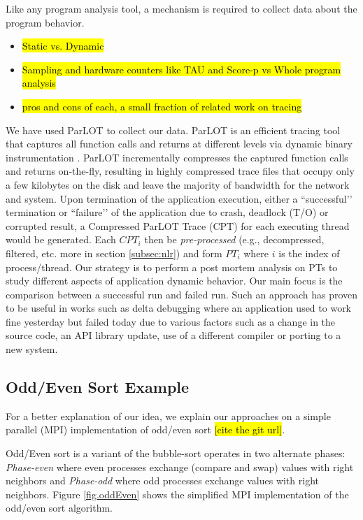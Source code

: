 Like any program analysis tool, a mechanism is required to collect data about the program behavior.

\begin{itemize}
\item \hl{Static vs. Dynamic}
\item \hl{Sampling and hardware counters like TAU and Score-p vs Whole program analysis}
\item \hl{pros and cons of each, a small fraction of related work on tracing}
\end{itemize}

We have used ParLOT \cite{parlot} to collect our data.
%
ParLOT is an efficient tracing tool that captures all function calls and returns at different levels via dynamic binary instrumentation \cite{pin}.
%
ParLOT incrementally compresses the captured function calls and returns on-the-fly, resulting in highly compressed trace files that occupy only a few kilobytes on the disk and leave the majority of bandwidth for the network and system.
%
Upon termination of the application execution, either a ``successful’’ termination or ``failure’’ of the application due to crash, deadlock (T/O) or corrupted result, a Compressed ParLOT Trace (CPT) for each executing thread would be generated. Each $CPT_i$ then be \textit{pre-processed} (e.g., decompressed, filtered, etc. more in section \ref{subsec:nlr}) and form  $PT_i$ where $i$ is the index of process/thread.
%
Our strategy is to perform a post mortem analysis on PTs to study different aspects of application dynamic behavior.
%
Our main focus is the comparison between a successful run and failed run.
%
Such an approach has proven to be useful in works such as delta debugging \cite{choi-concurentDelta} where an application used to work fine yesterday but failed today due to various factors such as a change in the source code, an API library update, use of a different compiler or porting to a new system.

\subsection{Odd/Even Sort Example}

For a better explanation of our idea, we explain our approaches on a simple parallel (MPI) implementation of odd/even sort \hl{[cite the git url]}.

Odd/Even sort is a variant of the bubble-sort operates in two alternate phases: \textit{Phase-even} where even processes exchange (compare and swap) values with right neighbors and \textit{Phase-odd} where odd processes exchange values with right neighbors. Figure \ref{fig.oddEven} shows the simplified MPI implementation of the odd/even sort algorithm.


